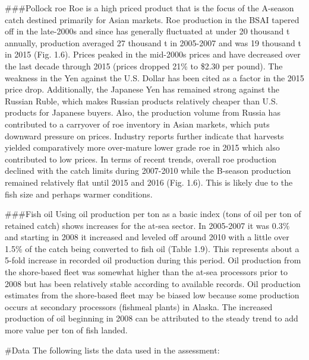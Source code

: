\#\#\#Pollock roe Roe is a high priced product that is the focus of the
A-season catch destined primarily for Asian markets. Roe production in
the BSAI tapered off in the late-2000s and since has generally
fluctuated at under 20 thousand t annually, production averaged 27
thousand t in 2005-2007 and was 19 thousand t in 2015 (Fig. 1.6). Prices
peaked in the mid-2000s prices and have decreased over the last decade
through 2015 (prices dropped 21\% to \$2.30 per pound). The weakness in
the Yen against the U.S. Dollar has been cited as a factor in the 2015
price drop. Additionally, the Japanese Yen has remained strong against
the Russian Ruble, which makes Russian products relatively cheaper than
U.S. products for Japanese buyers. Also, the production volume from
Russia has contributed to a carryover of roe inventory in Asian markets,
which puts downward pressure on prices. Industry reports further
indicate that harvests yielded comparatively more over-mature lower
grade roe in 2015 which also contributed to low prices. In terms of
recent trends, overall roe production declined with the catch limits
during 2007-2010 while the B-season production remained relatively flat
until 2015 and 2016 (Fig. 1.6). This is likely due to the fish size and
perhaps warmer conditions.

\#\#\#Fish oil Using oil production per ton as a basic index (tons of
oil per ton of retained catch) shows increases for the at-sea sector. In
2005-2007 it was 0.3\% and starting in 2008 it increased and leveled off
around 2010 with a little over 1.5\% of the catch being converted to
fish oil (Table 1.9). This represents about a 5-fold increase in
recorded oil production during this period. Oil production from the
shore-based fleet was somewhat higher than the at-sea processors prior
to 2008 but has been relatively stable according to available records.
Oil production estimates from the shore-based fleet may be biased low
because some production occurs at secondary processors (fishmeal plants)
in Alaska. The increased production of oil beginning in 2008 can be
attributed to the steady trend to add more value per ton of fish landed.

\#Data The following lists the data used in the assessment:

